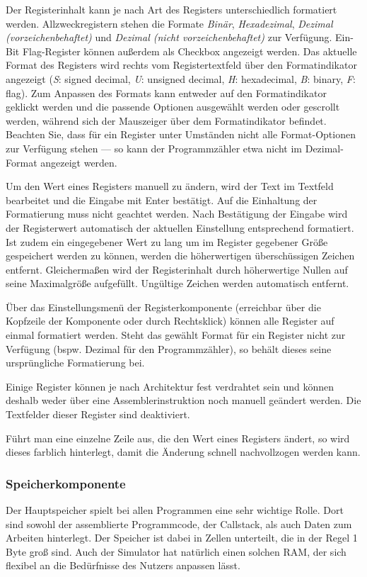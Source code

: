 Der Registerinhalt kann je nach Art des Registers unterschiedlich formatiert
werden. Allzweckregistern stehen die Formate \textit{Binär},
\textit{Hexadezimal}, \textit{Dezimal (vorzeichenbehaftet)} und \textit{Dezimal
(nicht vorzeichenbehaftet)} zur Verfügung. Ein-Bit Flag-Register können außerdem
als Checkbox angezeigt werden. Das aktuelle Format des Registers wird rechts vom
Registertextfeld über den Formatindikator angezeigt (\textit{S}: signed decimal,
\textit{U}: unsigned decimal, \textit{H}: hexadecimal, \textit{B}: binary,
\textit{F}: flag). Zum Anpassen des Formats kann entweder auf den
Formatindikator geklickt werden und die passende Optionen ausgewählt werden oder
gescrollt werden, während sich der Mauszeiger über dem Formatindikator befindet.
Beachten Sie, dass für ein Register unter Umständen nicht alle Format-Optionen
zur Verfügung stehen --- so kann der Programmzähler etwa nicht im Dezimal-Format
angezeigt werden.

Um den Wert eines Registers manuell zu ändern, wird der Text im Textfeld
bearbeitet und die Eingabe mit Enter bestätigt. Auf die Einhaltung der
Formatierung muss nicht geachtet werden. Nach Bestätigung der Eingabe wird der
Registerwert automatisch der aktuellen Einstellung entsprechend formatiert. Ist
zudem ein eingegebener Wert zu lang um im Register gegebener Größe gespeichert
werden zu können, werden die höherwertigen überschüssigen Zeichen entfernt.
Gleichermaßen wird der Registerinhalt durch höherwertige Nullen auf seine
Maximalgröße aufgefüllt. Ungültige Zeichen werden automatisch entfernt.

Über das Einstellungsmenü der Registerkomponente (erreichbar über die Kopfzeile
der Komponente oder durch Rechtsklick) können alle Register auf einmal
formatiert werden. Steht das gewählt Format für ein Register nicht zur Verfügung
(bspw. Dezimal für den Programmzähler), so behält dieses seine ursprüngliche
Formatierung bei.

Einige Register können je nach Architektur fest verdrahtet sein und können
deshalb weder über eine Assemblerinstruktion noch manuell geändert werden. Die
Textfelder dieser Register sind deaktiviert.

Führt man eine einzelne Zeile aus, die den Wert eines Registers ändert, so wird
dieses farblich hinterlegt, damit die Änderung schnell nachvollzogen werden
kann.


\subsubsection{Speicherkomponente}
Der Hauptspeicher spielt bei allen Programmen eine sehr wichtige Rolle. Dort
sind sowohl der assemblierte Programmcode, der Callstack, als auch Daten zum
Arbeiten hinterlegt. Der Speicher ist dabei in Zellen unterteilt, die in der
Regel 1 Byte groß sind. Auch der Simulator hat natürlich einen solchen RAM, der
sich flexibel an die Bedürfnisse des Nutzers anpassen lässt.

